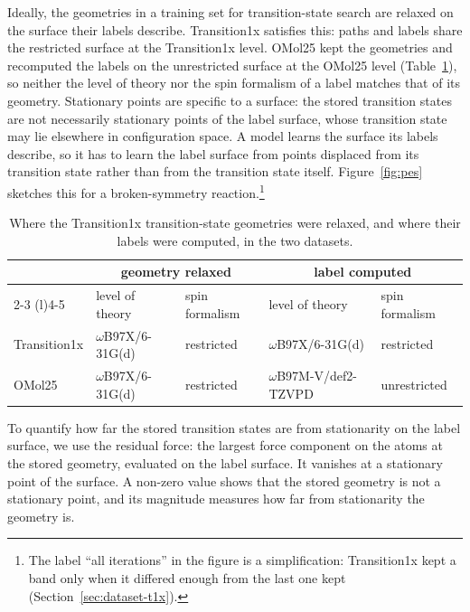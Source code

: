 Ideally, the geometries in a training set for transition-state search
are relaxed on the surface their labels describe. Transition1x
satisfies this: paths and labels share the restricted surface at the
Transition1x level. OMol25 kept the geometries and recomputed the labels
on the unrestricted surface at the OMol25 level
(Table~\ref{tab:t1x-vs-omol-labels}), so neither the level of theory nor
the spin formalism of a label matches that of its geometry. Stationary
points are specific to a surface: the stored transition states are not
necessarily stationary points of the label surface, whose transition
state may lie elsewhere in configuration space. A model learns the surface its
labels describe, so it has to learn the label surface from points
displaced from its transition state rather than from the transition
state itself.
Figure~\ref{fig:pes} sketches this for a broken-symmetry
reaction.\footnote{The label ``all iterations'' in the figure is a
simplification: Transition1x kept a band only when it differed enough
from the last one kept (Section~\ref{sec:dataset-t1x}).}

\begin{table}[H]
\centering
\small
\caption{Where the Transition1x transition-state geometries were
relaxed, and where their labels were computed, in the two datasets.}
\label{tab:t1x-vs-omol-labels}
\begin{tabular}{@{}lllll@{}}
\toprule
 & \multicolumn{2}{c}{geometry relaxed} & \multicolumn{2}{c}{label computed} \\
\cmidrule(lr){2-3} \cmidrule(l){4-5}
 & level of theory & spin formalism & level of theory & spin formalism \\
\midrule
Transition1x & $\omega$B97X/6-31G(d) & restricted & $\omega$B97X/6-31G(d) & restricted \\
OMol25       & $\omega$B97X/6-31G(d) & restricted & $\omega$B97M-V/def2-TZVPD & unrestricted \\
\bottomrule
\end{tabular}
\end{table}

To quantify how far the stored transition states are from stationarity
on the label surface, we use the residual force: the largest force
component on the atoms at the stored geometry, evaluated on the label
surface. It vanishes at a stationary point of the surface. A non-zero
value shows that the stored geometry is not a stationary point, and its
magnitude measures how far from stationarity the geometry is.

